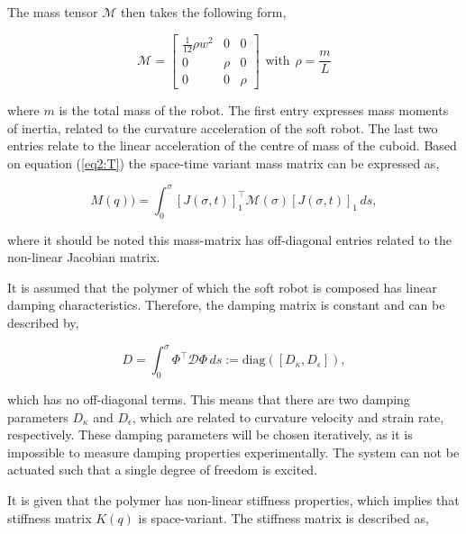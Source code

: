 The mass tensor $\mathcal{M}$ then takes the following form,

\begin{equation}
    \mathcal{M} = \begin{bmatrix} \frac{1}{12}\rho w^2 & 0 & 0 \\
                                   0 & \rho & 0 \\
                                   0 & 0 & \rho \end{bmatrix}\hspace{5pt} \text{with} \hspace{5pt} \rho = \frac{m}{L}
\end{equation} 




where $m$ is the total mass of the robot. The first entry expresses mass moments of inertia, related to the curvature acceleration of the soft robot. The last two entries relate to the linear acceleration of the centre of mass of the cuboid. Based on equation (\ref{eq2:T}) the space-time variant mass matrix can be expressed as, 


\begin{equation}
    M(q)) = \int_0^{\sigma} [J(\sigma,t)]_1^\top \mathcal{M}(\sigma)[J(\sigma,t)]_1  \hspace{2pt}ds,
\end{equation}

where it should be noted this mass-matrix has off-diagonal entries related to the non-linear Jacobian matrix. 

It is assumed that the polymer of which the soft robot is composed has linear damping characteristics. Therefore, the damping matrix is constant and can be described by,

\begin{equation}
    D = \int_0^\sigma \Phi^\top \mathcal{D} \Phi \hspace{2pt} ds  := \text{diag}([D_\kappa, D_\epsilon]),
\end{equation}

which has no off-diagonal terms. This means that there are two damping parameters $D_\kappa$ and $D_\epsilon$, which are related to curvature velocity and strain rate, respectively. These damping parameters will be chosen iteratively, as it is impossible to measure damping properties experimentally. The system can not be actuated such that a single degree of freedom is excited. 

It is given that the polymer has non-linear stiffness properties, which implies that stiffness matrix $K(q)$ is space-variant. The stiffness matrix is described as,

